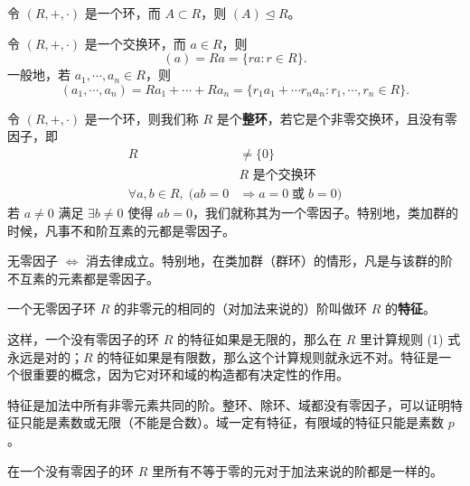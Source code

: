 \begin{proposition}[命题 2.10：由子集生成的理想仍是理想]
令 $(R,+,\cdot)$ 是一个环，而 $A\subset R$，则 $(A)\trianglelefteq R$。
\end{proposition}

\begin{proposition}[命题 2.11：交换环中主理想的表达式]
令 $(R,+,\cdot)$ 是一个交换环，而 $a\in R$，则
\[
(a)=Ra=\{ra:r\in R\}.
\]
一般地，若 $a_1,\cdots,a_n\in R$，则
\[
(a_1,\cdots,a_n)=Ra_1+\cdots+Ra_n=\{r_1a_1+\cdots r_na_n:r_1,\cdots,r_n\in R\}.
\]
\end{proposition}

\begin{definition}[定义 2.18：整环没有零因子是交换环]
令 $(R,+,\cdot)$ 是一个环，则我们称 $R$ 是个\textbf{整环}，若它是个非零交换环，且没有零因子，即
\begin{align}
R&\ne\{0\}\\
&R\text{ 是个交换环}\\
\forall a,b\in R,\;(ab=0&\Longrightarrow a=0\;\text{或}\;b=0)
\end{align}
若 $a\ne 0$ 满足 $\exists b\ne 0$ 使得 $ab=0$，我们就称其为一个零因子。特别地，类加群的时候，凡事不和阶互素的元都是零因子。
\end{definition}

\begin{note}[零因子与消去律互相证明]
无零因子 $\Leftrightarrow$ 消去律成立。特别地，在类加群（群环）的情形，凡是与该群的阶不互素的元素都是零因子。
\end{note}

\begin{definition}
一个无零因子环 $R$ 的非零元的相同的（对加法来说的）阶叫做环 $R$ 的\textbf{特征}。

这样，一个没有零因子的环 $R$ 的特征如果是无限的，那么在 $R$ 里计算规则 (1) 式永远是对的；$R$ 的特征如果是有限数，那么这个计算规则就永远不对。特征是一个很重要的概念，因为它对环和域的构造都有决定性的作用。
\end{definition}

\begin{note}[定理2 整环除环域的特征]
特征是加法中所有非零元素共同的阶。整环、除环、域都没有零因子，可以证明特征只能是素数或无限（不能是合数）。域一定有特征，有限域的特征只能是素数 $p$。
\end{note}

\begin{theorem}
在一个没有零因子的环 $R$ 里所有不等于零的元对于加法来说的阶都是一样的。
\end{theorem}

